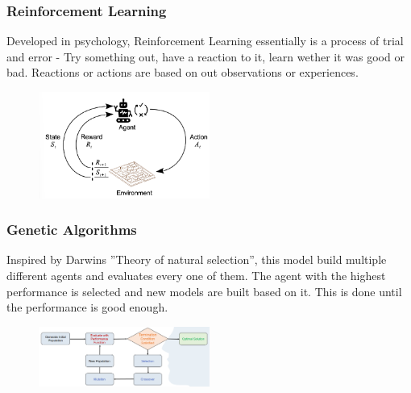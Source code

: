 \documentclass[
../../EiKI_Summary.tex,
]
{subfiles}
\begin{document}
\subsubsection{Reinforcement Learning}
Developed in psychology, Reinforcement Learning essentially is a process of trial and error - Try something out, have a reaction to it, learn wether it was good or bad. Reactions or actions are based on out observations or experiences.

\begin{figure}
    [htp]
    \centering
    \includegraphics[width=0.5\textwidth]{Pics/2/ReinforcementLearningLoop.png}
\end{figure}

\newpage
\subsubsection{Genetic Algorithms}
Inspired by Darwins ''Theory of natural selection'', this model build multiple different agents and evaluates every one of them. The agent with the highest performance is selected and new models are built based on it. This is done until the performance is good enough.

\begin{figure}
    [htp]
    \centering
    \includegraphics[width=0.5\textwidth]{Pics/2/GeneticAlgorithms.png}
\end{figure}
\end{document}
